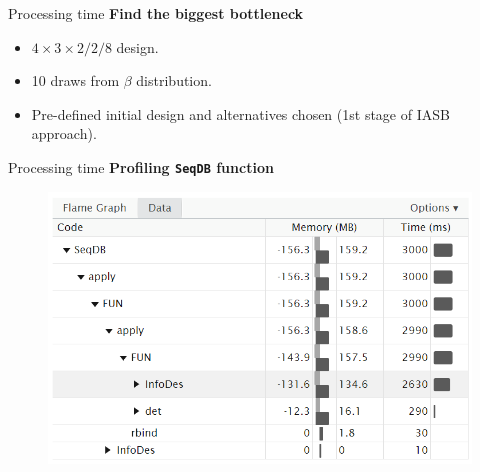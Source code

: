 \documentclass[11pt,t]{beamer}
\begin{document}
\begin{frame}[fragile]{Processing time}
	\textbf{Find the biggest bottleneck}
	\begin{itemize}
		\item $4 \times 3 \times 2/2/8$ design.
		\item 10 draws from $\beta$ distribution.
		\item Pre-defined initial design and alternatives chosen (1st stage of IASB approach).
	\end{itemize}
\end{frame}

\begin{frame}[fragile]{Processing time}
\textbf{Profiling \texttt{SeqDB} function}
\begin{figure}
			\includegraphics[scale = .7]{mygraphics/Profiling1.png}
		\end{figure}
\end{frame}
\end{document}

